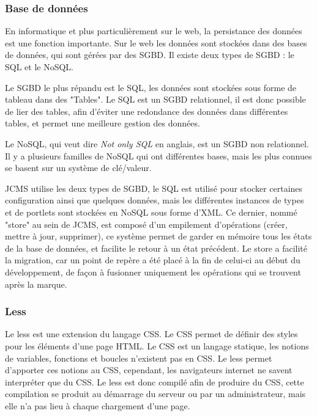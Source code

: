 \documentclass[12pt,a4paper]{article}
\begin{document}
\subsubsection{Base de données}
En informatique et plus particulièrement sur le web, la persistance des données est une fonction importante. Sur le web les données sont stockées dans des bases de données, qui sont gérées par des \gls{SGBD}. Il existe deux types de \gls{SGBD} : le SQL et le NoSQL.\par 
\medskip
Le \gls{SGBD} le plus répandu est le SQL, les données sont stockées sous forme de tableau dans des "Tables". Le SQL est un \gls{SGBD} relationnel, il est donc possible de lier des tables, afin d'éviter une redondance des données dans différentes tables, et permet une meilleure gestion des données.\par
\medskip
Le NoSQL, qui veut dire \textit{Not only SQL} en anglais, est un \gls{SGBD} non relationnel. Il y a plusieurs familles de NoSQL qui ont différentes bases, mais les plus connues se basent sur un système de clé/valeur.\par
\medskip
\gls{JCMS} utilise les deux types de \gls{SGBD}, le SQL est utilisé pour stocker certaines configuration ainsi que quelques données, mais les différentes instances de types et de portlets sont stockées en NoSQL sous forme d'XML. Ce dernier, nommé "store" au sein de \gls{JCMS}, est composé d'un empilement d'opérations (créer, mettre à jour, supprimer), ce système permet de garder en mémoire tous les états de la base de données, et facilite le retour à un état précédent. Le store a facilité la migration, car un point de repère a été placé à la fin de celui-ci au début du développement, de façon à fusionner uniquement les opérations qui se trouvent après la marque.\par

\subsubsection{Less}
Le less est une extension du langage \gls{CSS}. Le \gls{CSS} permet de définir des styles pour les éléments d'une page \gls{HTML}. Le \gls{CSS} est un langage statique, les notions de variables, fonctions et boucles n'existent pas en \gls{CSS}. Le less permet d'apporter ces notions au \gls{CSS}, cependant, les navigateurs internet ne savent interpréter que du \gls{CSS}. Le less est donc compilé afin de produire du \gls{CSS}, cette compilation se produit au démarrage du serveur ou par un administrateur, mais elle n'a pas lieu à chaque chargement d'une page.\par 
\end{document}
